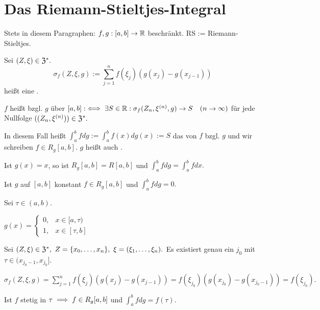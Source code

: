 \documentclass[a4paper,oneside,DIV15,BCOR12mm]{scrbook}
\begin{document}
\def\intab*{\int_a^b}
\chapter{Das Riemann-Stieltjes-Integral}
\theoremstyle{nonumberbreak}
\newtheorem{bezeichnungen}{Bezeichnungen}

Stets in diesem Paragraphen: $f,g:[a,b] \to \mathbb{R}$ beschränkt. RS := Riemann-Stieltjes.

\begin{definition}
\begin{liste}
\item Sei $(Z,\xi) \in \mathfrak{Z}^*.$ $$\sigma_f(Z,\xi,g) := \sum_{j=1}^nf(\xi_j)(g(x_j)-g(x_{j-1}))$$ heißt eine .
\item $f$ heißt  bzgl. $g$ über $[a,b] :\iff \exists S \in \mathbb{R}: \sigma_f(Z_n,\xi^{(n)},g) \to S\quad (n \to \infty)$ für jede Nullfolge $((Z_n,\xi^{(n)})) \in \mathfrak{Z}^*.$

In diesem Fall heißt $\intab* fdg := \intab* f(x)dg(x) := S$ das  von $f$ bzgl. $g$ und wir schreiben $f \in R_g[a,b]$. $g$ heißt auch .
\end{liste}
\end{definition}

\begin{beispiele}
\item Ist $g(x)=x$, so ist $R_g[a,b] = R[a,b]$ und $\intab* fdg = \intab* fdx.$
\item Ist $g$ auf $[a,b]$ konstant \folgt $f \in R_g[a,b]$ und $\intab* fdg = 0.$
\item Sei $\tau \in (a,b).$

$g(x) = \begin{cases} 0,& x \in [a,\tau) \\ 1,& x \in [\tau,b] \end{cases}$

Sei $(Z,\xi) \in \mathfrak{Z}^*,\ Z = \{x_0,\ldots,x_n\},\ \xi = (\xi_1,\ldots,\xi_n).$ Es existiert genau ein $j_0$ mit $\tau \in (x_{j_0-1},x_{j_0}]$.

$\sigma_f(Z,\xi,g) = \sum_{j=1}^nf(\xi_j)(g(x_j)-g(x_{j-1})) = f(\xi_{j_0})(g(x_{j_0}) - g(x_{{j_0}-1})) = f(\xi_{j_0}).$

Ist $f$ stetig in $\tau \implies f \in R_g[a,b]$ und $\intab* fdg = f(\tau).$
\end{beispiele}
\end{document}
